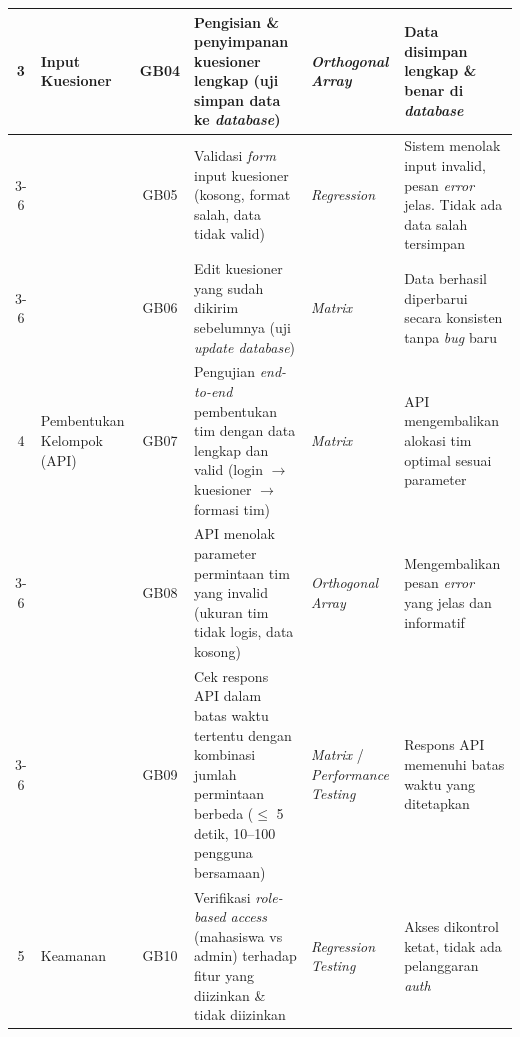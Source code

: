{\begin{longtable}{|c|p{1.4cm}|c|p{2.4cm}|p{1.3cm}|p{1.9cm}|}
			\hline
			3           & Input Kuesioner            & GB04          & Pengisian \& penyimpanan kuesioner lengkap (uji simpan data ke \textit{database})                                                     & \textit{Orthogonal Array}                      & Data disimpan lengkap \& benar di \textit{database}                                                         \\
			\cline{3-6}
			            &                            & GB05          & Validasi \textit{form} input kuesioner (kosong, format salah, data tidak valid)                                                       & \textit{Regression}                            & Sistem menolak input invalid, pesan \textit{error} jelas. Tidak ada data salah tersimpan                    \\
			\cline{3-6}
			            &                            & GB06          & Edit kuesioner yang sudah dikirim sebelumnya (uji \textit{update database})                                                           & \textit{Matrix}                                & Data berhasil diperbarui secara konsisten tanpa \textit{bug} baru                                           \\
			\hline
			4           & Pembentukan Kelompok (API) & GB07          & Pengujian \textit{end-to-end} pembentukan tim dengan data lengkap dan valid (login $\rightarrow$ kuesioner $\rightarrow$ formasi tim) & \textit{Matrix}                                & API mengembalikan alokasi tim optimal sesuai parameter                                                      \\
			\cline{3-6}
			            &                            & GB08          & API menolak parameter permintaan tim yang invalid (ukuran tim tidak logis, data kosong)                                               & \textit{Orthogonal Array}                      & Mengembalikan pesan \textit{error} yang jelas dan informatif                                                \\
			\cline{3-6}
			            &                            & GB09          & Cek respons API dalam batas waktu tertentu dengan kombinasi jumlah permintaan berbeda ($\leq$ 5 detik, 10--100 pengguna bersamaan)    & \textit{Matrix} / \textit{Performance Testing} & Respons API memenuhi batas waktu yang ditetapkan                                                            \\
			\hline
			5           & Keamanan                   & GB10          & Verifikasi \textit{role-based access} (mahasiswa vs admin) terhadap fitur yang diizinkan \& tidak diizinkan                           & \textit{Regression Testing}                    & Akses dikontrol ketat, tidak ada pelanggaran \textit{auth}                                                  \\

\end{longtable}}

